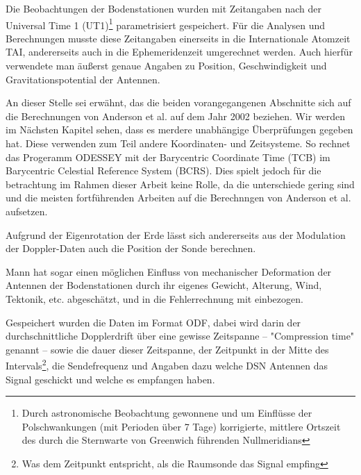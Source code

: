 Die Beobachtungen der Bodenstationen wurden mit Zeitangaben nach der Universal Time 1 (UT1)\footnote{Durch astronomische
Beobachtung gewonnene und um Einflüsse der Polschwankungen (mit Perioden über 7 Tage) korrigierte, mittlere Ortszeit des
durch die Sternwarte von Greenwich führenden Nullmeridians} parametrisiert gespeichert. Für die Analysen und
Berechnungen musste diese Zeitangaben einerseits in die Internationale Atomzeit TAI, andererseits auch in die
Ephemeridenzeit umgerechnet werden. Auch hierfür verwendete man äußerst genaue Angaben zu Position, Geschwindigkeit und
Gravitationspotential der Antennen.\cite{Dittus2006}

An dieser Stelle sei erwähnt, das die beiden vorangegangenen Abschnitte sich auf die Berechnungen von Anderson et al. auf dem Jahr 2002 beziehen.
Wir werden im Nächsten Kapitel sehen, dass es merdere unabhängige Überprüfungen gegeben hat.
Diese verwenden zum Teil andere Koordinaten- und Zeitsysteme.
So rechnet das Progeramm ODESSEY mit der Barycentric Coordinate Time (TCB) im Barycentric Celestial Reference System (BCRS).
Dies spielt jedoch für die betrachtung im Rahmen dieser Arbeit keine Rolle, da die unterschiede gering sind und
die meisten fortführenden Arbeiten auf die Berechnngen von Anderson et al. aufsetzen.	%


Aufgrund der Eigenrotation der Erde lässt sich andererseits aus der Modulation der  Doppler-Daten auch die
Position der Sonde berechnen. %

Mann hat sogar einen möglichen Einfluss von mechanischer Deformation der Antennen der Bodenstationen durch ihr eigenes Gewicht,
Alterung, Wind, Tektonik, etc. abgeschätzt, und in die Fehlerrechnung mit einbezogen.\cite{Dittus2006} %


Gespeichert wurden die Daten im Format ODF, dabei wird darin der durchschnittliche Dopplerdrift über eine gewisse Zeitspanne
– "Compression time" genannt – sowie die dauer dieser Zeitspanne, der Zeitpunkt in der Mitte des Intervals\footnote{Was dem Zeitpunkt entspricht, als die Raumsonde das Signal empfing\cite{Levey2008}}, die Sendefrequenz und
Angaben dazu welche DSN Antennen das Signal geschickt und welche es empfangen haben.\cite{Levey2008} 	%




